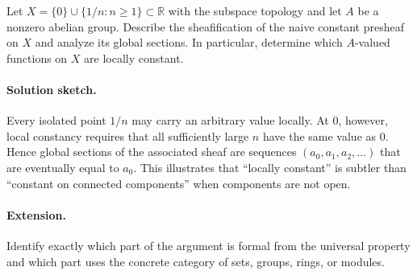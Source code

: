 \begin{problem}
Let $X=\{0\}\cup\{1/n:n\ge1\}\subset\mathbb R$ with the subspace topology and let $A$ be a nonzero abelian group. Describe the sheafification of the naive constant presheaf on $X$ and analyze its global sections. In particular, determine which $A$-valued functions on $X$ are locally constant.
\end{problem}
\ifdefined\FullProblemDossiers
\paragraph{Solution sketch.}
Every isolated point $1/n$ may carry an arbitrary value locally. At $0$, however, local constancy requires that all sufficiently large $n$ have the same value as $0$. Hence global sections of the associated sheaf are sequences $(a_0,a_1,a_2,\ldots)$ that are eventually equal to $a_0$. This illustrates that ``locally constant'' is subtler than ``constant on connected components'' when components are not open.
\paragraph{Extension.}
Identify exactly which part of the argument is formal from the universal property and which part uses the concrete category of sets, groups, rings, or modules.
\fi
